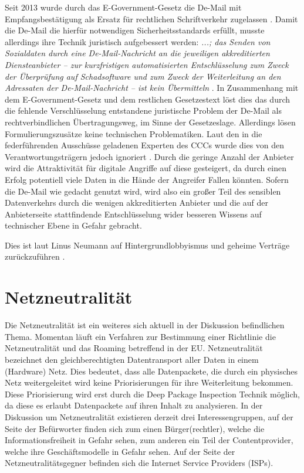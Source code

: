 \documentclass[
	12pt,
	a4paper,
	BCOR10mm,
	DIV14,
	listof=totoc,
	bibliography=totoc,
	headsepline
]{scrreprt}
\begin{document}
Seit 2013 wurde durch das E-Government-Gesetz die De-Mail mit Empfangsbestätigung als Ersatz für rechtlichen Schriftverkehr zugelassen \cite{egov}.
Damit die De-Mail die hierfür notwendigen Sicherheitsstandards erfüllt, musste allerdings ihre Technik juristisch aufgebessert werden:
\textit{ ...; das Senden von Sozialdaten durch eine De-Mail-Nachricht an die jeweiligen akkreditierten Diensteanbieter – zur kurzfristigen automatisierten Entschlüsselung zum Zweck der Überprüfung auf Schadsoftware und zum Zweck der Weiterleitung an den Adressaten der De-Mail-Nachricht – ist kein Übermitteln\grqq} \cite{sozgesb10}.
In Zusammenhang mit dem E-Government-Gesetz und dem restlichen Gesetzestext löst dies das durch die fehlende Verschlüsselung entstandene juristische Problem der De-Mail als rechtverbindlichen Übertragungsweg, im Sinne der Gesetzeslage.
Allerdings lösen Formulierungszusätze keine technischen Problematiken. 
Laut den in die federführenden Ausschüsse geladenen Experten des CCCs wurde dies von den Verantwortungsträgern jedoch ignoriert \cite{bsinger}.
Durch die geringe Anzahl der Anbieter wird die Attraktivität für digitale Angriffe auf diese gesteigert, da durch einen Erfolg potentiell viele Daten in die Hände der Angreifer Fallen könnten.
Sofern die De-Mail wie gedacht genutzt wird, wird also ein großer Teil des sensiblen Datenverkehrs durch die wenigen akkreditierten Anbieter und die auf der Anbieterseite stattfindende Entschlüsselung wider besseren Wissens auf technischer Ebene in Gefahr gebracht.

Dies ist laut Linus Neumann auf Hintergrundlobbyismus und geheime Verträge zurückzuführen \cite{bsinger}.




\section{Netzneutralität}
\label{netneutr}
Die Netzneutralität ist ein weiteres sich aktuell in der Diskussion befindlichen Thema.
Momentan läuft ein Verfahren zur Bestimmung einer Richtlinie die Netzneutralität und das Roaming betreffend in der EU.
Netzneutralität bezeichnet den gleichberechtigten Datentransport aller Daten in einem (Hardware) Netz.
Dies bedeutet, dass alle Datenpackete, die durch ein physisches Netz weitergeleitet wird keine Priorisierungen für ihre Weiterleitung bekommen.
Diese Priorisierung wird erst durch die Deep Package Inspection Technik möglich, da diese es erlaubt Datenpackete auf ihren Inhalt zu analysieren.
In der Diskussion um Netzneutralität existieren derzeit drei Interessengruppen, auf der Seite der Befürworter finden sich zum einen Bürger(rechtler), welche die Informationsfreiheit in Gefahr sehen, zum anderen ein Teil der Contentprovider, welche ihre Geschäftsmodelle in Gefahr sehen.
Auf der Seite der Netzneutralitätsgegner befinden sich die Internet Service Providers (ISPs).
\end{document}
